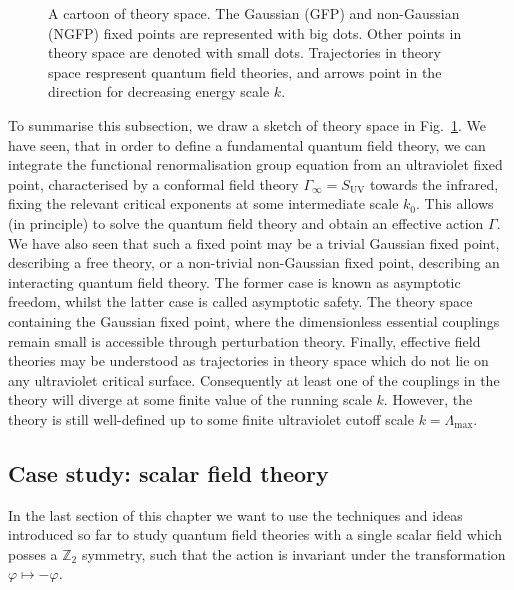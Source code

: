 \documentclass[11pt]{book}
\numberwithin{equation}{chapter}
\begin{document}
\begin{figure}
  \begin{center}
    
  \end{center}
  \vspace*{-4mm}
  \caption{
    A cartoon of theory space. The Gaussian (GFP) and non-Gaussian (NGFP)
    fixed points are represented with big dots. Other points in theory
    space are denoted with small dots. Trajectories in theory space
    respresent quantum field theories, and arrows point in the direction
    for decreasing energy scale $k$.
  }
  \label{fig:theoryspace}
\end{figure}
\bigskip
\noindent
To summarise this subsection, we draw a sketch of theory
space in Fig.~\ref{fig:theoryspace}.
We have seen, that in order to define a fundamental
quantum field theory, we can integrate the functional
renormalisation group equation from an ultraviolet
fixed point, characterised by a conformal field theory
$\Gamma_\infty = S_{\mathrm{\scriptscriptstyle{UV}}}$
towards the infrared,
fixing the relevant critical exponents at some
intermediate scale $k_0$. This allows (in principle)
to solve the quantum field theory and obtain
an effective action $\Gamma$. We have also seen
that such a fixed point may be a trivial Gaussian
fixed point, describing
a free theory,
or a non-trivial non-Gaussian fixed point, describing an
interacting quantum field theory. The former case
is known as asymptotic freedom, whilst the latter case
is called asymptotic safety. The theory space containing
the Gaussian fixed point, where the dimensionless essential
couplings remain small is accessible through perturbation
theory. Finally, effective field theories may be understood
as trajectories in theory space which do not
lie on any ultraviolet critical surface.
Consequently at least one of the couplings in the theory will diverge
at some finite value of the running scale $k$.
However, the theory is still well-defined
up to some finite ultraviolet cutoff scale
$k=\Lambda_{\mathrm{\scriptscriptstyle{max}}}$.


\subsection{Case study: scalar field theory}
\label{sec:casestudy}

In the last section of this chapter we want to use
the techniques and ideas introduced so far to study
quantum field theories with a single scalar field
which posses a $\mathbb Z_2$ symmetry, such that the
action is invariant under the transformation
$\varphi \mapsto - \varphi$.
\end{document}
